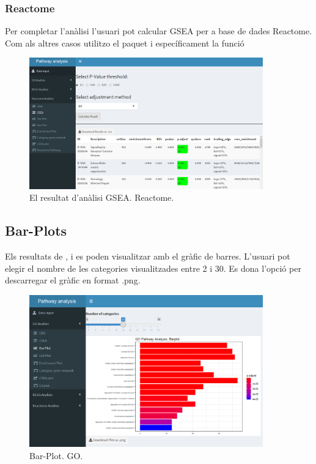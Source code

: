 \documentclass[]{article}
\begin{document}
\subsubsection{Reactome}
Per completar l'anàlisi l'usuari pot calcular GSEA per a base de dades Reactome. Com als altres casos utilitzo el paquet  i específicament la funció 

\begin{figure}[H]
\centering
\includegraphics[width=0.9\textwidth]{App_F13_Items_RA_GSEA.png} 
\caption{El resultat d'anàlisi GSEA. Reactome.}
\end{figure}

\subsection{Bar-Plots}
Els resultats de ,  i  es poden visualitzar amb el gràfic de barres. L'usuari pot elegir el nombre de les categories visualitzades entre 2 i 30. Es dona l'opció per descarregar el gràfic en format .png.

\begin{figure}[H]
\centering
\includegraphics[width=0.9\textwidth]{App_F14_Items_GO_BarPlot.png} 
\caption{Bar-Plot. GO.}
\end{figure}
\end{document}
